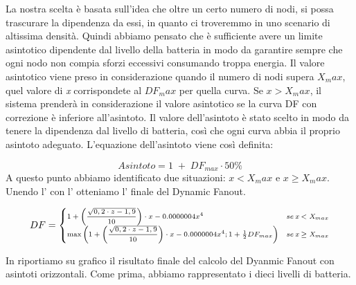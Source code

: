 La nostra scelta è basata sull'idea che oltre un certo numero di nodi, si possa trascurare la dipendenza da essi, in quanto ci troveremmo in uno scenario di altissima densità. Quindi abbiamo pensato che è sufficiente avere un limite asintotico dipendente dal livello della batteria in modo da garantire sempre che ogni nodo non compia sforzi eccessivi consumando troppa energia. Il valore asintotico viene preso in considerazione quando il numero di nodi supera $\textit{X}_max$, quel valore di \textit{x} corrispondete al $DF_max$ per quella curva. Se $\textit{x}>\textit{X}_max$, il sistema prenderà in considerazione il valore asintotico se la curva DF con correzione è inferiore all'asintoto.
Il valore dell'asintoto è stato scelto in modo da tenere la dipendenza dal livello di batteria, così che ogni curva abbia il proprio asintoto adeguato. L'equazione dell'asintoto viene così definita:

\begin{equation}
	\label{eq:df_asintoto}
	Asintoto = 1\;+\;DF_{max}\cdot 50\%
\end{equation}
A questo punto abbiamo identificato due situazioni: $\textit{x}<\textit{X}_max$ e $\textit{x}\geq \textit{X}_max$. Unendo l' con l' otteniamo l' finale del Dynamic Fanout.
\medskip

\begin{equation}
\label{eq:DF_totale}
	\scriptsize
	DF = \begin{cases} 1 + \left( \dfrac{\sqrt{0,2\cdot z - 1,9}}{10} \right) \cdot x- 0.0000004x^4 & se\,\textit{x}<\textit{X}_{max}\\
						\max \left( 1 + \left( \dfrac{\sqrt{0,2\cdot z - 1,9}}{10} \right) \cdot x- 0.0000004x^4 ; 1 + \frac{1}{2}DF_{max} \right) & se\,\textit{x}\geq\textit{X}_{max}\end{cases}
	\normalsize
\end{equation}



In  riportiamo su grafico il risultato finale del calcolo del Dyanmic Fanout con asintoti orizzontali. Come prima, abbiamo rappresentato i dieci livelli di batteria.

